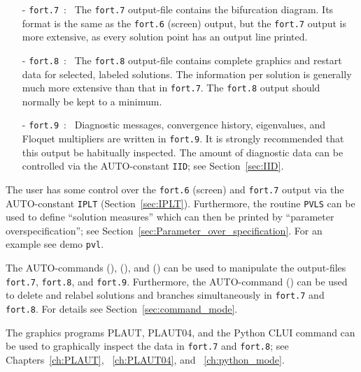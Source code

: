 \documentclass[12pt]{report}
\begin{document}
\begin{itemize}
\item[-] {\tt fort.7}~:~ 
  The {\tt fort.7} output-file contains the bifurcation diagram.
  Its format is the same as the {\tt fort.6} (screen) output, 
  but the {\tt fort.7} output is more extensive, as every solution point has 
  an output line printed.
\item[-] {\tt fort.8}~:~ 
  The {\tt fort.8} output-file contains complete graphics and restart data
  for selected, labeled solutions. 
  The information per solution is generally much more extensive than
  that in {\tt fort.7}. 
  The {\tt fort.8} output should normally be kept to a minimum.
\item[-] {\tt fort.9}~:~
  Diagnostic messages, convergence history, eigenvalues, and 
  Floquet multipliers are written in {\tt fort.9}.
  It is strongly recommended that this output be habitually inspected.
  The amount of diagnostic data can be controlled via the {\cal AUTO}-constant {\tt IID};
  see Section~\ref{sec:IID}.
\end{itemize}

The user has some control over the {\tt fort.6} (screen) and {\tt fort.7} output 
via the {\cal AUTO}-constant {\tt IPLT} (Section~\ref{sec:IPLT}).
Furthermore, the routine {\tt PVLS} can be used to define ``solution measures''
which can then be printed by ``parameter overspecification'';
see Section~\ref{sec:Parameter_over_specification}.
For an example see demo {\tt pvl}.

The {\cal AUTO}-commands (), (),
 and () can be used 
to manipulate  the output-files {\tt fort.7}, {\tt fort.8},
and {\tt fort.9}.
Furthermore, the {\cal AUTO}-command () can be
used to delete and
relabel solutions and branches simultaneously in {\tt fort.7} and {\tt fort.8}.
For details see Section~\ref{sec:command_mode}.

The graphics programs {\cal PLAUT}, {\cal PLAUT04}, and the Python
CLUI command  can be used to graphically inspect 
the data in {\tt fort.7} and {\tt fort.8}; see Chapters~\ref{ch:PLAUT},
~\ref{ch:PLAUT04}, and ~\ref{ch:python_mode}.
 
\end{document}
